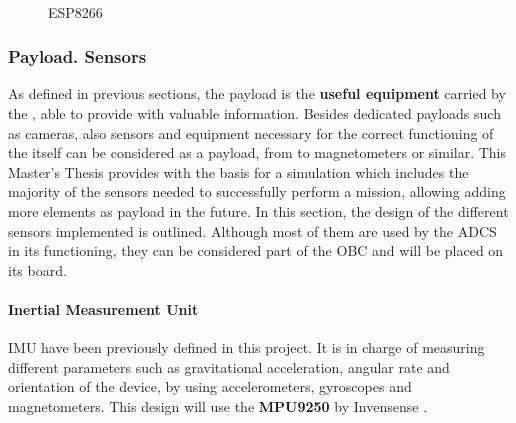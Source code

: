 \begin{figure}[H]
			\centering
			\\
			\caption{ESP8266 \cite{espressif}} 

\end{figure}

\subsubsection{Payload. Sensors}

As defined in previous sections, the payload is the \textbf{useful equipment} carried by the , able to provide with valuable information. Besides dedicated payloads such as cameras, also sensors and equipment necessary for the correct functioning of the  itself  can be considered as a payload, from  to magnetometers or similar. This Master's Thesis provides with the basis for a simulation  which includes the majority of the sensors needed to successfully perform a mission, allowing adding more elements as payload in the future. In this section, the design of the different sensors implemented is outlined. Although most of them are used by the \acrshort{ADCS} in its functioning, they can be considered part of the \acrshort{OBC} and will be placed on its board.


\paragraph{Inertial Measurement Unit}


\acrshort{IMU} have been previously defined in this project. It is in charge of measuring different parameters such as gravitational acceleration, angular rate and orientation of the device, by using accelerometers, gyroscopes and magnetometers. This design will use the \textbf{MPU9250} by Invensense \cite{mpu9250}.



